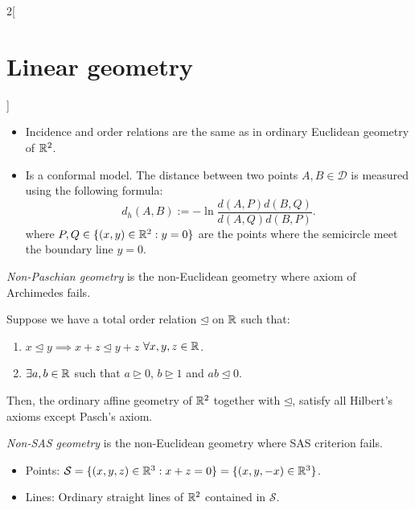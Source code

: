 \documentclass[../../../main.tex]{subfiles}
\begin{document}
\begin{multicols}{2}[\section{Linear geometry}]
\begin{definition}
\begin{itemize}
\begin{itemize}
              \item Incidence and order relations are the same as in ordinary Euclidean geometry of $\mathbb{R}^2$.
              \item Is a conformal model. The distance between two points $A,B\in\mathcal{D}$ is measured using the following formula: $$d_h(A,B):=-\ln\frac{d(A,P)d(B,Q)}{d(A,Q)d(B,P)}.$$ where $P,Q\in\{(x,y)\in\mathbb{R}^2:y=0\}$ are the points where the semicircle meet the boundary line $y=0$.
            \end{itemize}
            \begin{center}
              \begin{minipage}{\linewidth}
                \centering
                
              \end{minipage}
            \end{center}
    \end{itemize}
  \end{definition}
  \begin{definition}
    \emph{Non-Paschian geometry} is the non-Euclidean geometry where axiom of Archimedes fails.
  \end{definition}
  \begin{proposition}
    Suppose we have a total order relation $\unlhd$ on $\mathbb{R} $ such that:
    \begin{enumerate}
      \item $x\unlhd y\implies x+z\unlhd y+z$ $\forall x,y,z\in\mathbb{R} $.
      \item $\exists a,b\in\mathbb{R}$ such that $a\unrhd 0$, $b\unrhd 1$ and $ab\unlhd 0$.
    \end{enumerate}
    Then, the ordinary affine geometry of $\mathbb{R}^2$ together with $\unlhd$, satisfy all Hilbert's axioms except Pasch's axiom.
  \end{proposition}
  \begin{definition}
    \emph{Non-SAS geometry} is the non-Euclidean geometry where SAS criterion fails.
  \end{definition}
  \begin{proposition}
    \hfill
    \begin{itemize}
      \item Points: $\mathcal{S}=\{(x,y,z)\in\mathbb{R}^3:x+z=0\}=\{(x,y,-x)\in\mathbb{R}^3\}$.
      \item Lines: Ordinary straight lines of $\mathbb{R}^2$ contained in $\mathcal{S}$.

\end{itemize}
\end{proposition}
\end{multicols}
\end{document}
